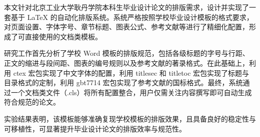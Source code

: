 
本文针对北京工业大学耿丹学院本科生毕业设计论文的排版需求，设计并实现了一套基于 LaTeX 的自动化排版系统。系统严格按照学校毕业设计模板的格式要求，对页面设置、字体字号、章节标题、图表公式、参考文献等进行了精细化配置，形成了可直接使用的文档类模板。

研究工作首先分析了学校 Word 模板的排版规范，包括各级标题的字号与行距、正文的缩进与段间距、图表的编号规则以及参考文献的著录格式。在此基础上，利用 ctex 宏包实现了中文字体的配置，利用 titlesec 和 titletoc 宏包实现了标题与目录格式的定制，利用 gbt7714 宏包实现了参考文献的国标格式。最终，系统通过一个文档类文件（.cls）将所有配置整合，用户仅需关注内容撰写即可自动生成符合规范的论文。

实验结果表明，该模板能够准确复现学校模板的排版效果，且具备良好的稳定性与可移植性，可显著提升毕业设计论文的排版效率与规范性。
